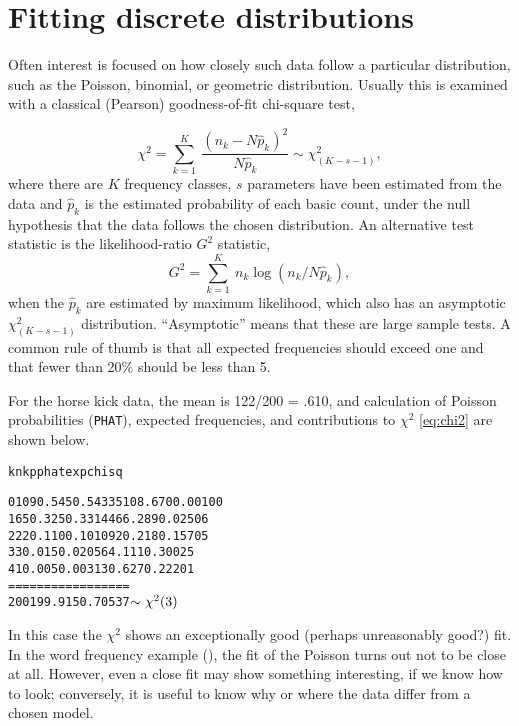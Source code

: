 \section{Fitting discrete distributions}\label{sec:discrete-fit}

Often interest is focused on how closely such data follow a
particular distribution, such as the Poisson, binomial, or geometric
distribution.  Usually this is examined with a classical (Pearson)
goodness-of-fit chi-square test,

\begin{equation}\label{eq:chi2}
  \chi^2 = \sum_{k=1}^K \:
  \frac{{ ( n_k - N \hat{p}_k ) }^2}
  { N \hat{p}_k }  \sim \chi^2_{( K-s-1 )}
  \comma
\end{equation}
where there are $K$ frequency classes, 
$s$ parameters have been estimated from the data and
\(\hat{p}_k\) is the estimated probability of each basic count,
under the null hypothesis that the data follows the chosen distribution.
An alternative test statistic is the likelihood-ratio $G^2$
statistic,
\begin{equation}\label{eq:g2}
 G^2 = \sum_{k=1}^K \: n_k \log ( n_k / N \hat{p}_k )
 \comma
\end{equation}
when the $\hat{p}_k$ are estimated by maximum likelihood,
which also has an asymptotic $\chi^2_{(K - s - 1)}$ distribution.
``Asymptotic'' means that these are large sample tests.
A common rule of thumb is that all expected frequencies
should exceed one and that fewer than 20\% should be less than 5.

For the horse kick data, the mean is 122/200 = .610, and calculation
of Poisson probabilities (\texttt{PHAT}), expected frequencies, and
contributions to \(\chi^2\) \eqref{eq:chi2} are shown below.

\begin{center}
\begin{alltt}
 k     nk      p        phat         exp     chisq

 0    109    0.545    0.54335    108.670    0.00100
 1     65    0.325    0.33144     66.289    0.02506
 2     22    0.110    0.10109     20.218    0.15705
 3      3    0.015    0.02056      4.111    0.30025
 4      1    0.005    0.00313      0.627    0.22201
      ===                        =======    =======
      200                        199.915    0.70537 \(\sim \chi\sp2 (3)\)
\end{alltt}
\end{center}

In this case the \(\chi^2\) shows an exceptionally good (perhaps unreasonably
good?) fit.  In the word frequency example
(), the fit of the Poisson
turns out not to be close at all.  However, even a close fit may show
something interesting, if we know how to look; conversely, it is
useful to know why or where the data differ from a chosen model.






